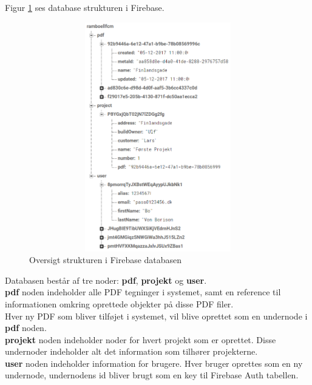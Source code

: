 Figur \ref{fig:FirebaseDB} ses database strukturen i Firebase. 
\begin{figure}[H] %
	\centering
	\includegraphics[height=10cm, width=15cm]{Design/Firebase/FirebaseDB}
	\caption{Oversigt strukturen i Firebase databasen}
	\label{fig:FirebaseDB}
\end{figure}
Databasen består af tre noder: \textbf{pdf}, \textbf{projekt} og \textbf{user}. \\
\textbf{pdf} noden indeholder alle PDF tegninger i systemet, samt en reference til informationen omkring oprettede objekter på disse PDF filer. \\
Hver ny PDF som bliver tilføjet i systemet, vil blive oprettet som en undernode i \textbf{pdf} noden. \\
\textbf{projekt} noden indeholder noder for hvert projekt som er oprettet. Disse undernoder indeholder alt det information som tilhører projekterne. \\
\textbf{user} noden indeholder information for brugere. Hver bruger oprettes som en ny undernode, undernodens id bliver brugt som en key til Firebase Auth tabellen.

\clearpage